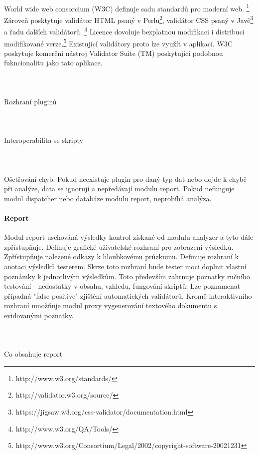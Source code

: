 \documentclass[10pt]{article}
\begin{document}
\paragraph{~}World wide web consorcium (W3C)  definuje sadu standardů pro moderní web. \footnote{http://www.w3.org/standards/} Zároveň posktytuje validátor HTML psaný v Perlu\footnote{http://validator.w3.org/source/}, validátor CSS psaný v Javě\footnote{https://jigsaw.w3.org/css-validator/documentation.html} a řadu dalších validátorů. \footnote{http://www.w3.org/QA/Tools/} Licence dovoluje bezplatnou modifikaci i distribuci modifikované verze.\footnote{http://www.w3.org/Consortium/Legal/2002/copyright-software-20021231} Existující validátory proto lze využít v aplikaci. W3C poskytuje komerční nástroj Validator Suite (TM) poskytující podobnou fukncionalitu jako tato aplikace.
\paragraph{~}Rozhraní pluginů
\paragraph{~}Interoperabilita se skripty
\paragraph{~}Ošetřování chyb. Pokud neexistuje plugin pro daný typ dat nebo dojde k chybě při analýze, data se ignorují a nepředávají modulu report. Pokud nefunguje modul dispatcher nebo databáze modulu report, neprobíhá analýza.
\paragraph{Report} Modul report uschováná výsledky kontrol získané od modulu analyzer a tyto dále zpřístupňuje. Definuje grafické uživatelské rozhraní pro zobrazení výsledků. Zpřístupňuje nalezené odkazy k hloubkovému průzkumu. Definuje rozhraní k anotaci výsledků testerem. Skrze toto rozhraní bude tester moci doplnit vlastní poznámky k jednotlivým výsledkům. Toto především zahrnuje poznatky ručního testování - nedostatky v obsahu, vzhledu, fungování skriptů. Lze poznamenat případná "false positive" zjištění automatických validátorů. Kromě interaktivního rozhraní umožňuje modul proxy vygenerování textového dokumentu s evidovanými poznatky. 
\paragraph{~}Co obsahuje report
\end{document}
